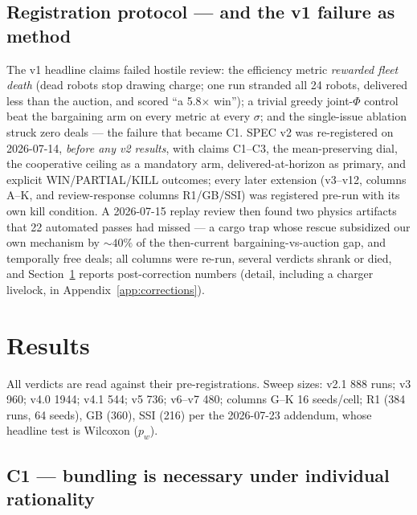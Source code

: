\documentclass[sigconf,nonacm]{acmart}
\begin{document}
\subsection{Registration protocol --- and the v1 failure as
method}\label{sec:registration}

The v1 headline claims failed hostile review: the efficiency metric
\emph{rewarded fleet death} (dead robots stop drawing charge; one run
stranded all 24 robots, delivered less than the auction, and scored ``a
5.8$\times$ win''); a trivial greedy joint-$\Phi$ control beat the
bargaining arm on every metric at every $\sigma$; and the single-issue
ablation struck zero deals --- the failure that became C1. SPEC v2 was
re-registered on 2026-07-14, \emph{before any v2 results}, with claims
C1--C3, the mean-preserving dial, the cooperative ceiling as a mandatory
arm, delivered-at-horizon as primary, and explicit WIN/PARTIAL/KILL
outcomes; every later extension (v3--v12, columns A--K, and review-response
columns R1/GB/SSI) was registered pre-run with its own kill condition. A
2026-07-15 replay review then found two physics artifacts that 22 automated
passes had missed --- a cargo trap whose rescue subsidized our own
mechanism by ${\sim}40\%$ of the then-current bargaining-vs-auction gap,
and temporally free deals; all columns were re-run, several verdicts shrank
or died, and Section~\ref{sec:results} reports post-correction numbers
(detail, including a charger livelock, in
Appendix~\ref{app:corrections}).

\section{Results}\label{sec:results}

All verdicts are read against their pre-registrations. Sweep sizes: v2.1
888 runs; v3 960; v4.0 1944; v4.1 544; v5 736; v6--v7 480; columns G--K 16
seeds/cell; R1 (384 runs, 64 seeds), GB (360), SSI (216) per the 2026-07-23
addendum, whose headline test is Wilcoxon ($p_w$).

\subsection{C1 --- bundling is necessary under individual
rationality}\label{sec:c1}
\end{document}
